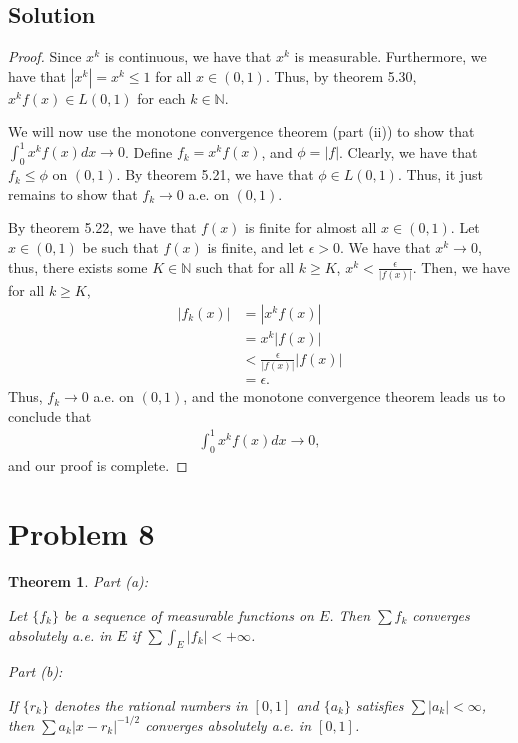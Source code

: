 \documentclass[10pt,a4paper]{article}
\makeatletter
\theoremstyle{theorem}
\newtheorem{theorem}{Theorem}
\newcommand{\proofpart}[2]{%
  \par
  \addvspace{\medskipamount}%
  \noindent\emph{Part #1: #2}\par\nobreak
  \addvspace{\smallskipamount}%
  \@afterheading
}
\theoremstyle{definition}
\makeatother
\begin{document}
\subsection*{Solution}
\begin{proof}
Since $x^k$ is continuous, we have that $x^k$ is measurable. Furthermore, we have that $|x^k| = x^k \leq 1$ for all $x \in (0, 1)$. Thus, by theorem 5.30, $x^kf(x) \in L(0, 1)$ for each $k \in \mathbb{N}$.

We will now use the monotone convergence theorem (part (ii)) to show that $\int_0^1 x^k f(x) dx \to 0$.  Define $f_k = x^k f(x)$, and $\phi = |f|$. Clearly, we have that $f_k \leq \phi$ on $(0, 1)$. By theorem 5.21, we have that $\phi \in L(0, 1)$. Thus, it just remains to show that $f_k \to 0$ a.e. on $(0, 1)$.

By theorem 5.22, we have that $f(x)$ is finite for almost all $x \in (0, 1)$. Let $x \in (0, 1)$ be such that $f(x)$ is finite, and let $\epsilon > 0$.  We have that $x^k \to 0$,  thus, there exists some $K \in \mathbb{N}$ such that for all $k \geq K$, $x^k < \frac{\epsilon}{|f(x)|}$. Then, we have for all $k \geq K$,
\begin{align*}
|f_k(x)| &= |x^k f(x)|\\
&= x^k |f(x)|\\
&< \frac{\epsilon}{|f(x)|} |f(x)|\\
&= \epsilon.
\end{align*}
Thus, $f_k \to 0$ a.e. on $(0, 1)$, and the monotone convergence theorem leads us to conclude that 
\begin{align*}
\int_0^1 x^k f(x) dx \to 0,
\end{align*}
and our proof is complete.
\end{proof}

\section*{Problem 8}
\begin{theorem}
\proofpart{(a)}{} Let $\{f_k \}$ be a sequence of measurable functions on $E$. Then $\sum f_k$ converges absolutely a.e. in $E$ if $\sum \int_E |f_k| < + \infty$.

\proofpart{(b)}{} If $\{r_k\}$ denotes the rational numbers in $[0, 1]$ and $\{a_k \}$ satisfies $\sum |a_k| < \infty$, then $\sum a_k |x - r_k|^{-1/2}$ converges absolutely a.e. in $[0, 1]$.
\end{theorem}
\end{document}
